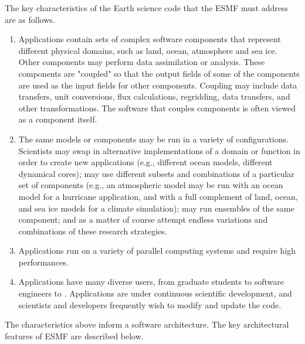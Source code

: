 The key characteristics of the Earth science code that the ESMF must address are as follows.
\begin{enumerate}

\item Applications contain sets of complex software components that represent different 
physical domains, such as land, ocean, atmosphere and sea ice.  Other components may perform 
data assimilation or analysis.  These components are "coupled" so that the output fields of 
some of the components are used 
as the input fields for other components.  Coupling may include data transfers, unit 
conversions, flux 
calculations, regridding, data transfers, and other transformations.  The software that 
couples components is often viewed as a component itself.  

\item The same models or components may be run in a variety of configurations.  Scientists 
may swap in
alternative implementations of a domain or function in order to create new applications 
(e.g., different 
ocean models, different dynamical cores); may use different subsets and combinations 
of a particular set of 
components (e.g., an atmospheric model may be run with an ocean model for a 
hurricane application, and 
with a full complement of land, ocean, and sea ice models for a climate simulation); may 
run ensembles of the same component; and as a matter of course attempt endless variations 
and combinations of these research strategies.

\item Applications run on a variety of parallel computing systems and require high performances. 

\item Applications have many diverse users, from graduate students to software engineers 
to .  Applications are under continuous scientific development, and scientists and developers 
frequently wish to modify and update the code.

\end{enumerate}

The characteristics above inform a software architecture.  The key architectural features 
of ESMF are described below.

